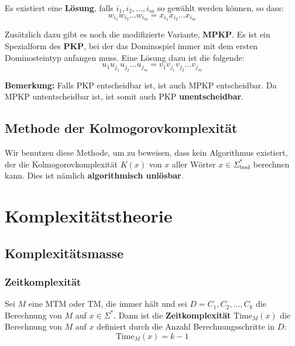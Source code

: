 \documentclass[11pt]{article}
\newcommand{\ttc}{\text{Time}}
\begin{document}
Es existiert eine \textbf{L{\"o}sung}, falls $i_1, i_2,..., i_m$ so gew{\"a}hlt werden k{\"o}nnen, so dass:
\begin{equation*}
	w_{i_1}w_{i_2}...w_{i_m} = x_{i_1}x_{i_2}...x_{i_m}
\end{equation*}

Zus{\"a}tzlich dazu gibt es noch die modifizierte Variante, \textbf{MPKP}. Es ist ein Spezialform des \textbf{PKP}, bei der das Dominospiel immer mit dem ersten Dominosteintyp anfangen muss. Eine L{\"o}sung dazu ist die folgende:
\begin{equation*}
	u_1u_{j_1}u_{j_2}...u_{j_m} = v_1v_{j_1}v_{j_2}...v_{j_m}
\end{equation*}

\textbf{Bemerkung:} Falls PKP entscheidbar ist, ist auch MPKP entscheidbar. Da MPKP untentscheidbar ist, ist somit auch PKP \textbf{unentscheidbar}.

\subsection{Methode der Kolmogorovkomplexit{\"a}t}

Wir benutzen diese Methode, um zu beweisen, dass kein Algorithmus existiert, der die Kolmogorovkomplexit{\"a}t $K(x)$ von $x$ aller W{\"o}rter $x \in \Sigma^*_\text{bool}$ berechnen kann. Dies ist n{\"a}mlich \textbf{algorithmisch unl{\"o}sbar}.

\section{Komplexit{\"a}tstheorie}

\subsection{Komplexit{\"a}tsmasse}

\subsubsection{Zeitkomplexit{\"a}t}

Sei $M$ eine MTM oder TM, die immer h{\"a}lt und sei $D = C_1,C_2,...,C_k$ die Berechnung von $M$ auf $x \in \Sigma^*$. Dann ist die \textbf{Zeitkomplexit{\"a}t} $\ttc_M(x)$ die Berechnung von $M$ auf $x$ definiert durch die Anzahl Berechnungsschritte in $D$:
\begin{equation*}
	\ttc_M(x) = k-1
\end{equation*}
\end{document}
